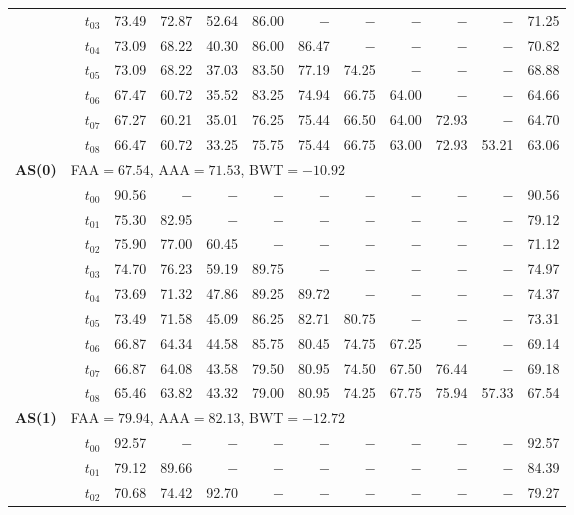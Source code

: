 \begin{table}[ht]
\begin{tabular}{@{}l l l *{10}{r}@{}}
 & & $t_{03}$ & 73.49 & 72.87 & 52.64 & 86.00 & $-$ & $-$ & $-$ & $-$ & $-$ & 71.25 \\
 & & $t_{04}$ & 73.09 & 68.22 & 40.30 & 86.00 & 86.47 & $-$ & $-$ & $-$ & $-$ & 70.82 \\
 & & $t_{05}$ & 73.09 & 68.22 & 37.03 & 83.50 & 77.19 & 74.25 & $-$ & $-$ & $-$ & 68.88 \\
 & & $t_{06}$ & 67.47 & 60.72 & 35.52 & 83.25 & 74.94 & 66.75 & 64.00 & $-$ & $-$ & 64.66 \\
 & & $t_{07}$ & 67.27 & 60.21 & 35.01 & 76.25 & 75.44 & 66.50 & 64.00 & 72.93 & $-$ & 64.70 \\
 & & $t_{08}$ & 66.47 & 60.72 & 33.25 & 75.75 & 75.44 & 66.75 & 63.00 & 72.93 & 53.21 & 63.06 \\
\midrule
\multirow{10}{*}{\textbf{AS(0)}} & \multicolumn{11}{l}{\quad\small FAA$=67.54$,\; AAA$=71.53$,\; BWT$=-10.92$} \\
 & & $t_{00}$ & 90.56 & $-$ & $-$ & $-$ & $-$ & $-$ & $-$ & $-$ & $-$ & 90.56 \\
 & & $t_{01}$ & 75.30 & 82.95 & $-$ & $-$ & $-$ & $-$ & $-$ & $-$ & $-$ & 79.12 \\
 & & $t_{02}$ & 75.90 & 77.00 & 60.45 & $-$ & $-$ & $-$ & $-$ & $-$ & $-$ & 71.12 \\
 & & $t_{03}$ & 74.70 & 76.23 & 59.19 & 89.75 & $-$ & $-$ & $-$ & $-$ & $-$ & 74.97 \\
 & & $t_{04}$ & 73.69 & 71.32 & 47.86 & 89.25 & 89.72 & $-$ & $-$ & $-$ & $-$ & 74.37 \\
 & & $t_{05}$ & 73.49 & 71.58 & 45.09 & 86.25 & 82.71 & 80.75 & $-$ & $-$ & $-$ & 73.31 \\
 & & $t_{06}$ & 66.87 & 64.34 & 44.58 & 85.75 & 80.45 & 74.75 & 67.25 & $-$ & $-$ & 69.14 \\
 & & $t_{07}$ & 66.87 & 64.08 & 43.58 & 79.50 & 80.95 & 74.50 & 67.50 & 76.44 & $-$ & 69.18 \\
 & & $t_{08}$ & 65.46 & 63.82 & 43.32 & 79.00 & 80.95 & 74.25 & 67.75 & 75.94 & 57.33 & 67.54 \\
\midrule
\multirow{10}{*}{\textbf{AS(1)}} & \multicolumn{11}{l}{\quad\small FAA$=79.94$,\; AAA$=82.13$,\; BWT$=-12.72$} \\
 & & $t_{00}$ & 92.57 & $-$ & $-$ & $-$ & $-$ & $-$ & $-$ & $-$ & $-$ & 92.57 \\
 & & $t_{01}$ & 79.12 & 89.66 & $-$ & $-$ & $-$ & $-$ & $-$ & $-$ & $-$ & 84.39 \\
 & & $t_{02}$ & 70.68 & 74.42 & 92.70 & $-$ & $-$ & $-$ & $-$ & $-$ & $-$ & 79.27 \\

\end{tabular}
\end{table}
